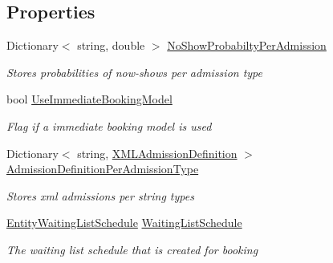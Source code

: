 \subsection*{Properties}
\begin{DoxyCompactItemize}
\item 
Dictionary$<$ string, double $>$ \hyperlink{class_general_health_care_elements_1_1_input_1_1_generic_x_m_l_h_c_dep_input_with_admission_and_booking_model_a573843c8d47aebb00332b52a262bc3c8}{No\+Show\+Probabilty\+Per\+Admission}
\begin{DoxyCompactList}\small\item\em Stores probabilities of now-\/shows per admission type \end{DoxyCompactList}\item 
bool \hyperlink{class_general_health_care_elements_1_1_input_1_1_generic_x_m_l_h_c_dep_input_with_admission_and_booking_model_ab2b797c7746509feddbd0ae668f14181}{Use\+Immediate\+Booking\+Model}
\begin{DoxyCompactList}\small\item\em Flag if a immediate booking model is used \end{DoxyCompactList}\item 
Dictionary$<$ string, \hyperlink{class_general_health_care_elements_1_1_input_1_1_x_m_l_input_classes_1_1_x_m_l_admission_definition}{X\+M\+L\+Admission\+Definition} $>$ \hyperlink{class_general_health_care_elements_1_1_input_1_1_generic_x_m_l_h_c_dep_input_with_admission_and_booking_model_ab9abefadffcb04d4eed18f8f8ab4882a}{Admission\+Definition\+Per\+Admission\+Type}
\begin{DoxyCompactList}\small\item\em Stores xml admissions per string types \end{DoxyCompactList}\item 
\hyperlink{class_general_health_care_elements_1_1_booking_models_1_1_entity_waiting_list_schedule}{Entity\+Waiting\+List\+Schedule} \hyperlink{class_general_health_care_elements_1_1_input_1_1_generic_x_m_l_h_c_dep_input_with_admission_and_booking_model_aff02044e306bfcd1954913df623a2142}{Waiting\+List\+Schedule}
\begin{DoxyCompactList}\small\item\em The waiting list schedule that is created for booking \end{DoxyCompactList}\item 

\end{DoxyCompactItemize}

